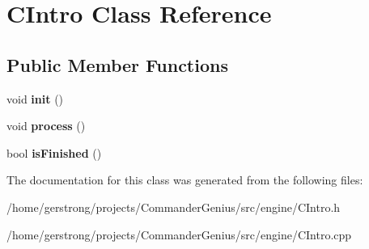 \hypertarget{class_c_intro}{
\section{CIntro Class Reference}
\label{class_c_intro}
}
\subsection*{Public Member Functions}
\begin{DoxyCompactItemize}
\item 
\hypertarget{class_c_intro_a85a818f1ee3b60b6eed029082f88a25b}{
void {\bfseries init} ()}
\label{class_c_intro_a85a818f1ee3b60b6eed029082f88a25b}

\item 
\hypertarget{class_c_intro_afe496075fbf9d3e9dae328f344571f12}{
void {\bfseries process} ()}
\label{class_c_intro_afe496075fbf9d3e9dae328f344571f12}

\item 
\hypertarget{class_c_intro_a0936660f21b480a54d65fb72e94ea8ec}{
bool {\bfseries isFinished} ()}
\label{class_c_intro_a0936660f21b480a54d65fb72e94ea8ec}

\end{DoxyCompactItemize}


The documentation for this class was generated from the following files:\begin{DoxyCompactItemize}
\item 
/home/gerstrong/projects/CommanderGenius/src/engine/CIntro.h\item 
/home/gerstrong/projects/CommanderGenius/src/engine/CIntro.cpp\end{DoxyCompactItemize}
